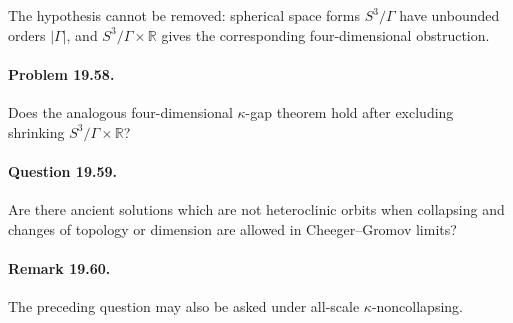 \begin{remark}
\label{rem:chow-iii-kappa-gap-hypothesis}
The hypothesis cannot be removed: spherical space forms $S^3/\Gamma$ have
unbounded orders $|\Gamma|$, and $S^3/\Gamma\times\mathbb R$ gives the
corresponding four-dimensional obstruction.
\end{remark}

\paragraph{Problem 19.58.}
\label{prob:chow-iii-4d-kappa-gap}
Does the analogous four-dimensional $\kappa$-gap theorem hold after excluding
shrinking $S^3/\Gamma\times\mathbb R$?

\paragraph{Question 19.59.}
\label{que:chow-iii-ancient-heteroclinic}
Are there ancient solutions which are not heteroclinic orbits when collapsing
and changes of topology or dimension are allowed in Cheeger--Gromov limits?

\paragraph{Remark 19.60.}
\label{rem:chow-iii-ancient-kappa-question}
The preceding question may also be asked under all-scale
$\kappa$-noncollapsing.
